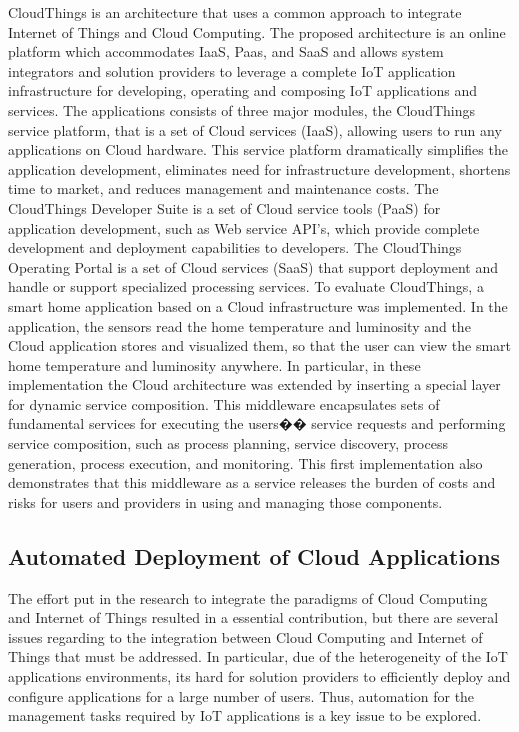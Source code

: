 CloudThings \cite{zhou2013cloudthings} is an architecture that uses a common approach to integrate Internet of Things and Cloud Computing. The proposed architecture
is an online platform which accommodates IaaS, Paas, and SaaS and allows system integrators and solution providers to leverage a complete IoT application
infrastructure for developing, operating and composing IoT applications and services. The applications consists of three major modules, the CloudThings
service platform, that is a set of Cloud services (IaaS), allowing users to run any applications on Cloud hardware. This service platform dramatically
simplifies the application development, eliminates need for infrastructure development, shortens time to market, and reduces management and maintenance
costs. The CloudThings Developer Suite is a set of Cloud service tools (PaaS) for application development, such as Web service API's, which provide complete
development and deployment capabilities to developers. The CloudThings Operating Portal is a set of Cloud services (SaaS) that support deployment and handle
or support specialized processing services. To evaluate CloudThings, a smart home application based on a Cloud infrastructure was implemented. In the application,
the sensors read the home temperature and luminosity and the Cloud application stores and visualized them, so that the user can view the smart home temperature and luminosity
anywhere. In particular, in these implementation the Cloud architecture was extended by inserting a special layer for dynamic service composition.
This middleware encapsulates sets of fundamental services for executing the users�� service requests and performing service composition, such as process planning,
service discovery, process generation, process execution, and monitoring. This first implementation also demonstrates that this middleware as a service
releases the burden of costs and risks for users and providers in using and managing those components.\\

\subsection{Automated Deployment of Cloud Applications}
\label{sub:Automated Deployment of IoT Applications}
The effort put in the research to integrate the paradigms of Cloud Computing and Internet of Things resulted in a essential contribution, but there are several
issues regarding to the integration between Cloud Computing and Internet of Things that must be addressed. In particular, due of the heterogeneity of the IoT
applications environments, its hard for solution providers to efficiently deploy and configure applications for a large number of users. Thus, automation for
the management tasks required by IoT applications is a key issue to be explored.\\

